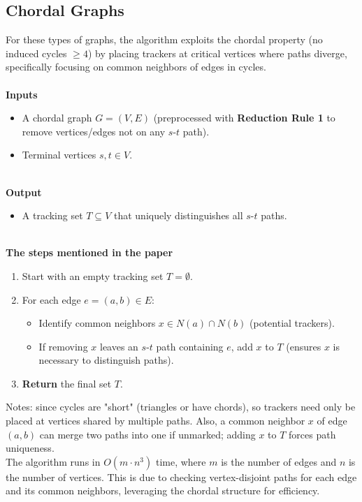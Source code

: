 \documentclass{article}
\begin{document}
\subsection{Chordal Graphs}
For these types of graphs, the algorithm exploits the chordal property (no induced cycles \(\geq 4\)) by placing trackers at critical vertices where paths diverge, specifically focusing on common neighbors of edges in cycles.
\\ \\
\textbf{Inputs}
\begin{itemize}
    \item A chordal graph \( G = (V, E) \) (preprocessed with \textbf{Reduction Rule 1} to remove vertices/edges not on any \( s \)-\( t \) path).
    \item Terminal vertices \( s, t \in V \).
\end{itemize}
\\
\textbf{Output}
\begin{itemize}
    \item A tracking set \( T \subseteq V \) that uniquely distinguishes all \( s \)-\( t \) paths.
\end{itemize}
\\
\textbf{The steps mentioned in the paper}
\begin{enumerate}
    \item Start with an empty tracking set \( T = \emptyset \).
    \item For each edge \( e = (a, b) \in E \):
    \begin{itemize}
        \item Identify common neighbors \( x \in N(a) \cap N(b) \) (potential trackers).
        \item If removing \( x \) leaves an \( s \)-\( t \) path containing \( e \), add \( x \) to \( T \) (ensures \( x \) is necessary to distinguish paths).
    \end{itemize}
    \item \textbf{Return} the final set \( T \).
\end{enumerate}

Notes: since cycles are "short" (triangles or have chords), so trackers need only be placed at vertices shared by multiple paths. Also, a common neighbor \( x \) of edge \( (a, b) \) can merge two paths into one if unmarked; adding \( x \) to \( T \) forces path uniqueness. \\

The algorithm runs in \( O(m \cdot n^3) \) time, where \( m \) is the number of edges and \( n \) is the number of vertices. This is due to checking vertex-disjoint paths for each edge and its common neighbors, leveraging the chordal structure for efficiency.
\end{document}
